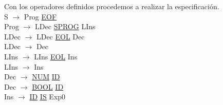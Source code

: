 \documentclass[\main/MemoriaPL.tex]{subfiles}
\begin{document}
    \par
    Con los operadores definidos procedemos a realizar la especificación.\\
    \vspace{2mm}
    S $\rightarrow$ Prog \underline{EOF}\\
    Prog $\rightarrow$ LDec \underline{SPROG} LIns\\
    LDec $\rightarrow$ LDec \underline{EOL} Dec\\
    LDec $\rightarrow$ Dec\\
    LIns $\rightarrow$ LIns \underline{EOL} Ins\\
    LIns $\rightarrow$ Ins\\
    Dec $\rightarrow$ \underline{NUM} \underline{ID}\\
    Dec $\rightarrow$ \underline{BOOL} \underline{ID}\\
    Ins $\rightarrow$ \underline{ID} \underline{IS} Exp0\\
    \vspace{2mm}
\end{document}
